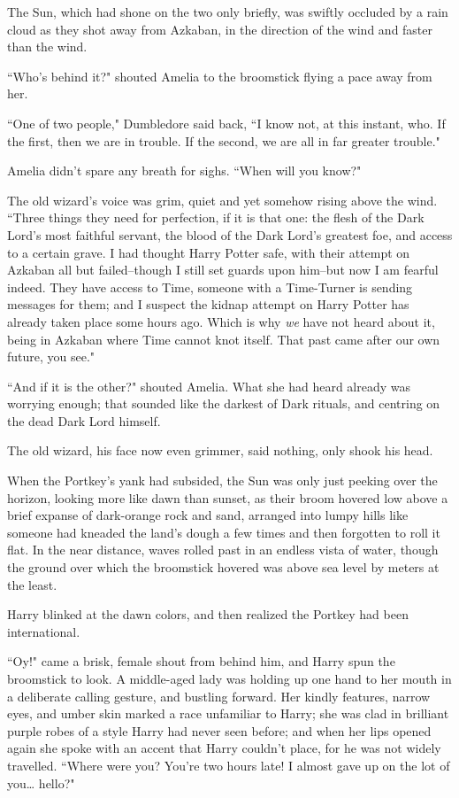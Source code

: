 \later

The Sun, which had shone on the two only briefly, was swiftly occluded by a rain cloud as they shot away from Azkaban, in the direction of the wind and faster than the wind.

``Who's behind it?" shouted Amelia to the broomstick flying a pace away from her.

``One of two people," Dumbledore said back, ``I know not, at this instant, who. If the first, then we are in trouble. If the second, we are all in far greater trouble."

Amelia didn't spare any breath for sighs. ``When will you know?"

The old wizard's voice was grim, quiet and yet somehow rising above the wind. ``Three things they need for perfection, if it is that one: the flesh of the Dark Lord's most faithful servant, the blood of the Dark Lord's greatest foe, and access to a certain grave. I had thought Harry Potter safe, with their attempt on Azkaban all but failed\---though I still set guards upon him\---but now I am fearful indeed. They have access to Time, someone with a Time-Turner is sending messages for them; and I suspect the kidnap attempt on Harry Potter has already taken place some hours ago. Which is why \emph{we} have not heard about it, being in Azkaban where Time cannot knot itself. That past came after our own future, you see."

``And if it is the other?" shouted Amelia. What she had heard already was worrying enough; that sounded like the darkest of Dark rituals, and centring on the dead Dark Lord himself.

The old wizard, his face now even grimmer, said nothing, only shook his head.

\later

When the Portkey's yank had subsided, the Sun was only just peeking over the horizon, looking more like dawn than sunset, as their broom hovered low above a brief expanse of dark-orange rock and sand, arranged into lumpy hills like someone had kneaded the land's dough a few times and then forgotten to roll it flat. In the near distance, waves rolled past in an endless vista of water, though the ground over which the broomstick hovered was above sea level by meters at the least.

Harry blinked at the dawn colors, and then realized the Portkey had been international.

``Oy!" came a brisk, female shout from behind him, and Harry spun the broomstick to look. A middle-aged lady was holding up one hand to her mouth in a deliberate calling gesture, and bustling forward. Her kindly features, narrow eyes, and umber skin marked a race unfamiliar to Harry; she was clad in brilliant purple robes of a style Harry had never seen before; and when her lips opened again she spoke with an accent that Harry couldn't place, for he was not widely travelled. ``Where were you? You're two hours late! I almost gave up on the lot of you{\ldots} hello?"

